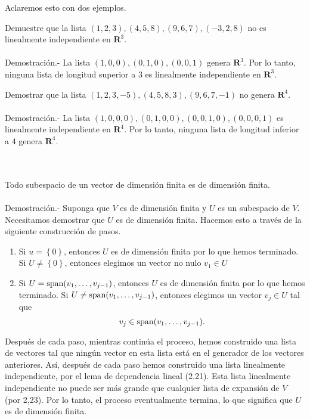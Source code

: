Aclaremos esto con dos ejemplos.

\begin{myejem}
    Demuestre que la lista $(1,2,3),(4,5,8),(9,6,7),(-3,2,8)$ no es linealmente independiente en $\textbf{R}^3$.\\\\
	Demostración.-\; La lista $(1,0,0),(0,1,0),(0,0,1)$ genera $\textbf{R}^3$. Por lo tanto, ninguna lista de longitud superior a $3$ es linealmente independiente en $\textbf{R}^3$.
\end{myejem}

\begin{myejem}
    Demostrar que la lista $(1,2,3,-5),(4,5,8,3),(9,6,7,-1)$ no genera $\textbf{R}^4$.\\\\	
	Demostración.-\; La lista $(1,0,0,0),(0,1,0,0),(0,0,1,0),(0,0,0,1)$ es linealmente independiente en $\textbf{R}^4$. Por lo tanto, ninguna lista de longitud inferior a $4$  genera $\textbf{R}^4$.
\end{myejem}

\setcounter{myteo}{25}
\begin{myteo}\; \\\\
    Todo subespacio de un vector de dimensión finita es de dimensión finita.\\\\
	Demostración.-\; Suponga que $V$ es de dimensión finita y $U$ es un subespacio de $V$. Necesitamos demostrar que $U$ es de dimensión finita. Hacemos esto a través de la siguiente construcción de  pasos. 
	\begin{enumerate}
	    \item Si $u=\left\{0\right\}$, entonces $U$ es de dimensión finita por lo que hemos terminado. Si $U\neq \left\{0\right\}$, entonces elegimos un vector no nulo $v_1\in U$
	    \item Si $U=\mathop{\mbox{\normalfont span}}\nolimits(v_1,\ldots,v_{j-1})$, entonces $U$ es de dimensión finita por lo que hemos terminado. Si $U\neq \mathop{\mbox{\normalfont span}}\nolimits(v_1,\ldots,v_{j-1})$, entonces elegimos un vector $v_j\in U$ tal que 
	    $$v_j\in \mathop{\mbox{\normalfont span}}\nolimits(v_1,\ldots,v_{j-1}).$$
	\end{enumerate}
	Después de cada paso, mientras continúa el proceso, hemos construido una lista de vectores tal que ningún vector en esta lista está en el generador de los vectores anteriores. Así, después de cada paso hemos construido una lista linealmente independiente, por el lema de dependencia lineal (2.21). Esta lista linealmente independiente no puede ser más grande que cualquier lista de expansión de $V$ (por 2,23). Por lo tanto, el proceso eventualmente termina, lo que significa que $U$ es de dimensión finita.
\end{myteo}

